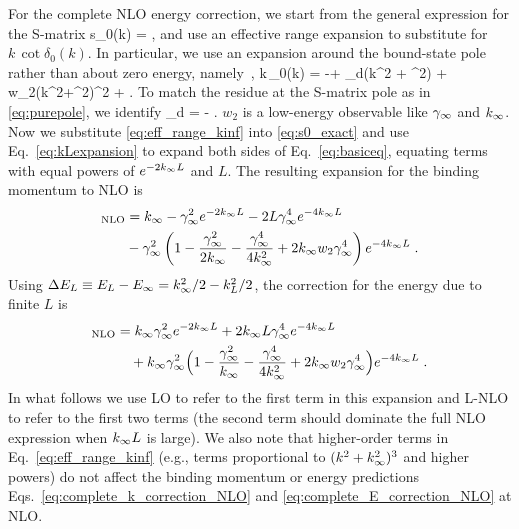 	For the complete NLO energy correction, we start from the
	general expression for the S-matrix
	\beq
	  s_0(k) = 
	  \;,
	  \label{eq:s0_exact}
	\eeq
	and use an effective range expansion to substitute for $k\,\cot
	\delta_0(k)$.  In particular, we use an expansion
	around the bound-state pole rather than about zero energy,
	namely~\cite{wu2011scattering,Phillips:1999hh},
	 \beq
	  k\,\cot\delta_0(k) = -\kinf +  \rho_d(k^2 + \kinf^2)
	     + w_2(k^2+\kinf^2)^2 +  \cdots
	     \;.
	     \label{eq:eff_range_kinf}
	\eeq
	To match the residue at the S-matrix pole as in \eqref{eq:purepole},
	we identify
	\beq
	 \rho_d =  - 
	  \;.
	  \label{eq:rhoD_gamma_rel}
	\eeq
	$w_2$ is a low-energy observable like $\gamma_\infty$ and $k_{\infty}$.
	Now we substitute \eqref{eq:eff_range_kinf} into \eqref{eq:s0_exact}
	and use Eq.~\eqref{eq:kLexpansion} to expand both sides of
	Eq.~\eqref{eq:basiceq}, equating terms with equal powers of
	$e^{-2k_{\infty} L}$ and $L$. The resulting expansion for the binding
	momentum to NLO is
	\begin{align}
    [k_L]_{\rm NLO} &=  \kinf - \ANC^2 e^{-2\kinf L}  - 2  L \ANC^4
		e^{-4\kinf L}
    \nonumber  \\
    &\null - \ANC^2 \left(1 - \frac{\ANC^2}{2\kinf} - \frac{\ANC^4}{4\kinf^2}
		+ 2 \kinf w_2 \ANC^4 \right) e^{-4\kinf L}
    \;.
    \label{eq:complete_k_correction_NLO}
  \end{align}
	Using $\Delta E_L \equiv E_L - E_{\infty} = k_{\infty}^2/2 - k_L^2/2$,
	the correction for the energy due to finite $L$ is
	\begin{align}
  	[\Delta E_L]_{\rm NLO} &=  \kinf \ANC^2 e^{-2\kinf L}
  	+ 2\kinf L\ANC^4 e^{-4\kinf L}
    \nonumber \\
  	& \null\quad +
    \kinf\ANC^2 \Bigl( 1-\frac{\ANC^2}{\kinf}-\frac{\ANC^4}{4\kinf^2}
    +
    2\kinf w_2 \ANC^4  \Bigr)  e^{-4\kinf L}
    \;.
    \label{eq:complete_E_correction_NLO}
\end{align}
	In what follows we use LO to refer to the first term in this expansion and
	L-NLO to
	refer to the first two terms (the second term should dominate the full
	NLO expression when $k_{\infty} L$ is large).  We also note that
	higher-order terms in Eq.~\eqref{eq:eff_range_kinf} (e.g., terms
	proportional to $(k^2+k_{\infty}^2)^3$ and higher powers) do not affect the
	binding momentum or energy predictions
	Eqs.~\eqref{eq:complete_k_correction_NLO} and
	\eqref{eq:complete_E_correction_NLO} at NLO.

